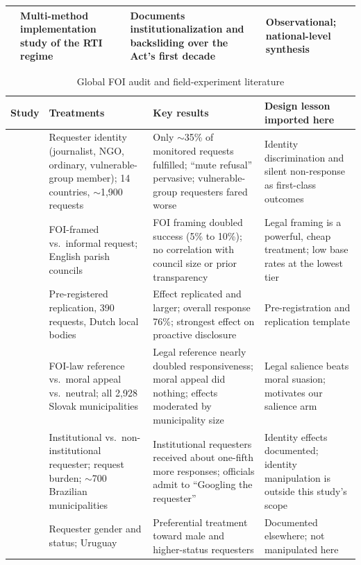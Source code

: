\documentclass[11pt]{article}
\begin{document}
\begin{table}[htbp]
\begin{tabularx}{\textwidth}{>{\raggedright\arraybackslash}p{2.6cm}LLL}
\addlinespace
\citet{relly2020} & Multi-method implementation study of the RTI regime & Documents institutionalization and backsliding over the Act's first decade & Observational; national-level synthesis \\
\bottomrule
\end{tabularx}
\end{table}

\begin{table}[htbp]
\centering
\caption{Global FOI audit and field-experiment literature}
\label{tab:lit_global}
\scriptsize
\begin{tabularx}{\textwidth}{>{\raggedright\arraybackslash}p{2.6cm}LLL}
\toprule
Study & Treatments & Key results & Design lesson imported here \\
\midrule
\citet{osji2006} & Requester identity (journalist, NGO, ordinary, vulnerable-group member); 14 countries, $\sim$1{,}900 requests & Only $\sim$35\% of monitored requests fulfilled; ``mute refusal'' pervasive; vulnerable-group requesters fared worse & Identity discrimination and silent non-response as first-class outcomes \\
\addlinespace
\citet{worthy2017} & FOI-framed vs.\ informal request; English parish councils & FOI framing doubled success (5\% to 10\%); no correlation with council size or prior transparency & Legal framing is a powerful, cheap treatment; low base rates at the lowest tier \\
\addlinespace
\citet{grimmelikhuijsen2019} & Pre-registered replication, 390 requests, Dutch local bodies & Effect replicated and larger; overall response 76\%; strongest effect on proactive disclosure & Pre-registration and replication template \\
\addlinespace
\citet{spac2018} & FOI-law reference vs.\ moral appeal vs.\ neutral; all 2{,}928 Slovak municipalities & Legal reference nearly doubled responsiveness; moral appeal did nothing; effects moderated by municipality size & Legal salience beats moral suasion; motivates our salience arm \\
\addlinespace
\citet{michener2020} & Institutional vs.\ non-institutional requester; request burden; $\sim$700 Brazilian municipalities & Institutional requesters received about one-fifth more responses; officials admit to ``Googling the requester'' & Identity effects documented; identity manipulation is outside this study's scope \\
\addlinespace
\citet{pineiro2018} & Requester gender and status; Uruguay & Preferential treatment toward male and higher-status requesters & Documented elsewhere; not manipulated here \\

\end{tabularx}
\end{table}
\end{document}
